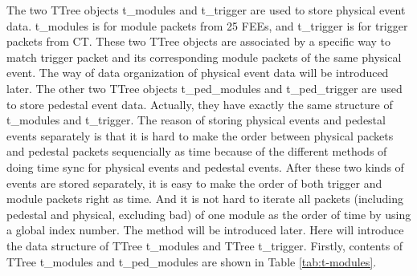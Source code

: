 \documentclass[a4paper, 12pt, onecolumn]{article}
\begin{document}
The two TTree objects t\_modules and t\_trigger are used to store physical event data.
t\_modules is for module packets from 25 FEEs, and t\_trigger is for trigger packets from CT.
These two TTree objects are associated by a specific way to match trigger packet and its corresponding module packets of the same physical event.
The way of data organization of physical event data will be introduced later.
The other two TTree objects t\_ped\_modules and t\_ped\_trigger are used to store pedestal event data.
Actually, they have exactly the same structure of t\_modules and t\_trigger.
The reason of storing physical events and pedestal events separately is that it is hard to make the order between physical packets and pedestal packets sequencially as time 
because of the different methods of doing time sync for physical events and pedestal events.
After these two kinds of events are stored separately, it is easy to make the order of both trigger and module packets right as time.
And it is not hard to iterate all packets (including pedestal and physical, excluding bad) of one module as the order of time by using a global index number.
The method will be introduced later.
Here will introduce the data structure of TTree t\_modules and TTree t\_trigger. Firstly, contents of TTree t\_modules and t\_ped\_modules are shown in Table \ref{tab:t-modules}.
\end{document}
